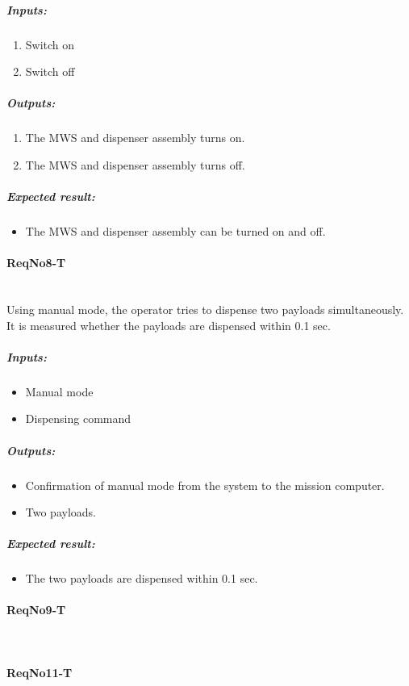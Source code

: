 \subparagraph{Inputs:}
	\begin{enumerate}
	\item Switch on
	\item Switch off
	\end{enumerate}
	\subparagraph{Outputs:}
	\begin{enumerate}
	\item The MWS and dispenser assembly turns on.
	\item The MWS and dispenser assembly turns off.
	\end{enumerate}
	\subparagraph{Expected result:}
	\begin{itemize}
	\item The MWS and dispenser assembly can be turned on and off.
	\end{itemize}


\paragraph{ReqNo8-T}\mbox{}\\ %
Using manual mode, the operator tries to dispense two payloads simultaneously. It is measured whether the payloads are dispensed within 0.1 sec.
\\
	\subparagraph{Inputs:}
	\begin{itemize}
	\item Manual mode
	\item Dispensing command
	\end{itemize}
	\subparagraph{Outputs:}
	\begin{itemize}
	\item Confirmation of manual mode from the system to the mission computer.
	\item Two payloads.
	\end{itemize}
	\subparagraph{Expected result:}
	\begin{itemize}
	\item The two payloads are dispensed within 0.1 sec.
	\end{itemize}

\paragraph{ReqNo9-T}\mbox{}\\ %


\paragraph{ReqNo11-T}\mbox{}\\ %


